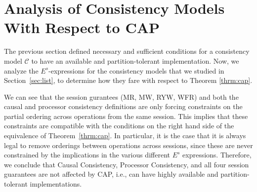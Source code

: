 \documentclass[acmlarge, ,11pt]{acmart}
\begin{document}
\section{Analysis of Consistency Models With Respect to CAP}\label{sec:capanalyze}

The previous section defined necessary and sufficient conditions for
a consistency model $\mathcal{C}$ to have an available and partition-tolerant
implementation. Now, we analyze the $E^s$-expressions for the consistency models that we studied in Section~\ref{sec:list}, to determine how they fare with respect to Theorem \ref{thrm:cap}.

We can see that the session gurantees (MR, MW, RYW, WFR) and both the causal and processor consistency definitions are only forcing constraints on the partial ordering across operations from the same session. This implies that these constraints are compatible with the conditions on the right hand side of the equivalence of Theorem~\ref{thrm:cap}. In particular, it is the case that it is always legal to remove orderings between operations across sessions, since these are never constrained by the implications in the various different $E^s$ expressions. Therefore, we conclude that Causal Consistency, Processor Consistency, and all four session guarantees are not affected by CAP, i.e., can have highly available and partition-tolerant implementations.
\end{document}
